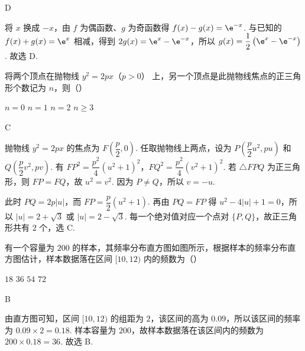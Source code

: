 \begin{answer}
D
\end{answer}

\begin{solution}
将 \(x\) 换成 \(-x\)，由 \(f\) 为偶函数、\(g\) 为奇函数得
\(f(x)-g(x)=\e^{-x}\). 与已知的 \(f(x)+g(x)=\e^x\) 相减，得到
\(2g(x)=\e^x-\e^{-x}\)，所以
\(g(x)=\dfrac{1}{2}\left(\e^x-\e^{-x}\right)\). 故选 D.
\end{solution}

\begin{problem}
将两个顶点在抛物线 \( y^{2} = 2px \)（\(p > 0\)） 上，另一个顶点是此抛物线焦点的正三角形个数记为 \( n \)，则（\quad）

\choices
    {\(n = 0\)}
    {\(n = 1\)}
    {\(n = 2\)}
    {\(n \geqslant 3\)}
\end{problem}

\begin{answer}
C
\end{answer}

\begin{solution}
抛物线 \(y^2=2px\) 的焦点为 \(F\left(\dfrac p2,0\right)\). 任取抛物线上两点，设为
\(P\left(\dfrac p2u^2,pu\right)\) 和 \(Q\left(\dfrac p2v^2,pv\right)\). 有
\(FP^2=\dfrac{p^2}{4}\left(u^2+1\right)^2\)，\(FQ^2=\dfrac{p^2}{4}\left(v^2+1\right)^2\). 若 \(\triangle FPQ\) 为正三角形，则 \(FP=FQ\)，故 \(u^2=v^2\). 因为 \(P\neq Q\)，所以 \(v=-u\).

此时 \(PQ=2p\lvert u\rvert\)，而 \(FP=\dfrac p2\left(u^2+1\right)\). 再由 \(PQ=FP\) 得
\(u^2-4\lvert u\rvert+1=0\)，所以 \(\lvert u\rvert=2+\sqrt{3}\) 或 \(\lvert u\rvert=2-\sqrt{3}\). 每一个绝对值对应一个点对 \(\{P,Q\}\)，故正三角形共有 \(2\) 个，选 C.
\end{solution}

\begin{problem}
有一个容量为 \(200\) 的样本，其频率分布直方图如图所示，根据样本的频率分布直方图估计，样本数据落在区间 \([10,12)\) 内的频数为（\quad）


\choices
    {\(18\)}
    {\(36\)}
    {\(54\)}
    {\(72\)}
\end{problem}

\begin{answer}
B
\end{answer}

\begin{solution}
由直方图可知，区间 \([10,12)\) 的组距为 \(2\)，该区间的高为 \(0.09\)，所以该区间的频率为
\(0.09\times2=0.18\). 样本容量为 \(200\)，故样本数据落在该区间内的频数为
\(200\times0.18=36\). 故选 B.
\end{solution}

